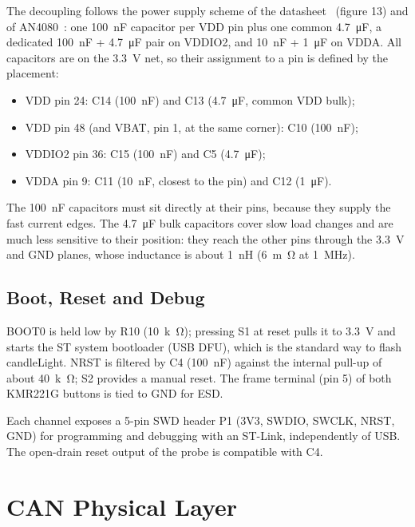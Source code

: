 \documentclass[11pt,a4paper]{article}
\begin{document}
The decoupling follows the power supply scheme of the datasheet~\cite{stm32} (figure 13) and of
AN4080~\cite{an4080}: one \qty{100}{nF} capacitor per VDD pin plus one common \qty{4.7}{\micro F}, a dedicated \qty{100}{nF}
+ \qty{4.7}{\micro F} pair on VDDIO2, and \qty{10}{nF} + \qty{1}{\micro F} on VDDA. All capacitors are on the \qty{3.3}{V} net, so
their assignment to a pin is defined by the placement:
\begin{itemize}
    \item VDD pin 24: C14 (\qty{100}{nF}) and C13 (\qty{4.7}{\micro F}, common VDD bulk);
    \item VDD pin 48 (and VBAT, pin 1, at the same corner): C10 (\qty{100}{nF});
    \item VDDIO2 pin 36: C15 (\qty{100}{nF}) and C5 (\qty{4.7}{\micro F});
    \item VDDA pin 9: C11 (\qty{10}{nF}, closest to the pin) and C12 (\qty{1}{\micro F}).
\end{itemize}
The \qty{100}{nF} capacitors must sit directly at their pins, because they supply the fast current edges.
The \qty{4.7}{\micro F} bulk capacitors cover slow load changes and are much less sensitive to their position:
they reach the other pins through the \qty{3.3}{V} and GND planes, whose inductance is about \qty{1}{nH}
(\qty{6}{m\ohm} at \qty{1}{MHz}).

\subsection{Boot, Reset and Debug}

BOOT0 is held low by R10 (\qty{10}{k\ohm}); pressing S1 at reset pulls it to \qty{3.3}{V} and starts the ST system
bootloader (USB DFU), which is the standard way to flash candleLight. NRST is filtered by
C4 (\qty{100}{nF}) against the internal pull-up of about \qty{40}{k\ohm}; S2 provides a manual reset. The frame
terminal (pin 5) of both KMR221G buttons is tied to GND for ESD.

Each channel exposes a 5-pin SWD header P1 (3V3, SWDIO, SWCLK, NRST, GND) for
programming and debugging with an ST-Link, independently of USB. The open-drain reset
output of the probe is compatible with C4.

\newpage
\section{CAN Physical Layer}
\end{document}
